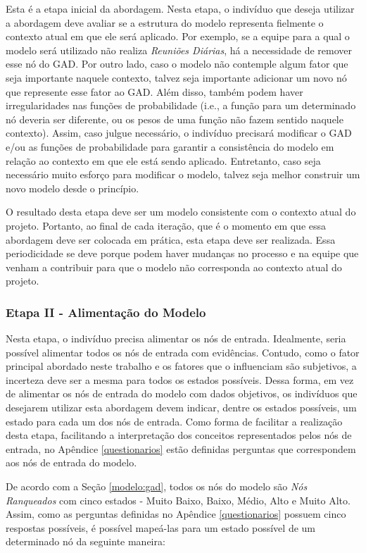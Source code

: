 Esta é a etapa inicial da abordagem. Nesta etapa, o indivíduo que deseja utilizar a abordagem deve avaliar se a estrutura do modelo representa fielmente o contexto atual em que ele será aplicado. Por exemplo, se a equipe para a qual o modelo será utilizado não realiza \textit{Reuniões Diárias}, há a necessidade de remover esse nó do GAD. Por outro lado, caso o modelo não contemple algum fator que seja importante naquele contexto, talvez seja importante adicionar um novo nó que represente esse fator ao GAD. Além disso, também podem haver irregularidades nas funções de probabilidade (i.e., a função para um determinado nó deveria ser diferente, ou os pesos de uma função não fazem sentido naquele contexto). Assim, caso julgue necessário, o indivíduo precisará modificar o GAD e/ou as funções de probabilidade para garantir a consistência do modelo em relação ao contexto em que ele está sendo aplicado. Entretanto, caso seja necessário muito esforço para modificar o modelo, talvez seja melhor construir um novo modelo desde o princípio.

O resultado desta etapa deve ser um modelo consistente com o contexto atual do projeto. Portanto, ao final de cada iteração, que é o momento em que essa abordagem deve ser colocada em prática, esta etapa deve ser realizada. Essa periodicidade se deve porque podem haver mudanças no processo e na equipe que venham a contribuir para que o modelo não corresponda ao contexto atual do projeto.

\subsubsection{Etapa II - Alimentação do Modelo}
\label{descricao:alimentacao}

Nesta etapa, o indivíduo precisa alimentar os nós de entrada. Idealmente, seria possível alimentar todos os nós de entrada com evidências. Contudo, como o fator principal abordado neste trabalho e os fatores que o influenciam são subjetivos, a incerteza deve ser a mesma para todos os estados possíveis. Dessa forma, em vez de alimentar os nós de entrada do modelo com dados objetivos, os indivíduos que desejarem utilizar esta abordagem devem indicar, dentre os estados possíveis, um estado para cada um dos nós de entrada. Como forma de facilitar a realização desta etapa, facilitando a interpretação dos conceitos representados pelos nós de entrada, no Apêndice \ref{questionarios} estão definidas perguntas que correspondem aos nós de entrada do modelo.

De acordo com a Seção \ref{modelo:gad}, todos os nós do modelo são \textit{Nós Ranqueados} com cinco estados - Muito Baixo, Baixo, Médio, Alto e Muito Alto. Assim, como as perguntas definidas no Apêndice \ref{questionarios} possuem cinco respostas possíveis, é possível mapeá-las para um estado possível de um determinado nó da seguinte maneira:

